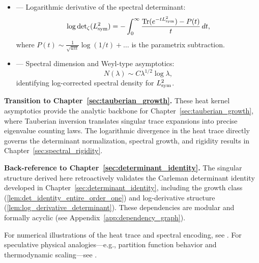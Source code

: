 \begin{itemize}
  \item {} — Logarithmic derivative of the spectral determinant:
  \[
  \log \det\nolimits_{\zeta}(L_{\mathrm{sym}}^2)
  = -\int_0^\infty \frac{\operatorname{Tr}(e^{-t L_{\mathrm{sym}}^2}) - P(t)}{t} \, dt,
  \]
  where \( P(t) \sim \frac{1}{\sqrt{4\pi t}} \log(1/t) + \dots \) is the parametrix subtraction.

  \item {} — Spectral dimension and Weyl-type asymptotics:
  \[
  N(\lambda) \sim C \lambda^{1/2} \log \lambda,
  \]
  identifying log-corrected spectral density for \( L_{\mathrm{sym}}^2 \).
\end{itemize}

\medskip

\noindent\textbf{Transition to Chapter~\ref{sec:tauberian_growth}.}  
These heat kernel asymptotics provide the analytic backbone for Chapter~\ref{sec:tauberian_growth}, where Tauberian inversion translates singular trace expansions into precise eigenvalue counting laws. The logarithmic divergence in the heat trace directly governs the determinant normalization, spectral growth, and rigidity results in Chapter~\ref{sec:spectral_rigidity}.

\medskip

\noindent\textbf{Back-reference to Chapter~\ref{sec:determinant_identity}.}  
The singular structure derived here retroactively validates the Carleman determinant identity developed in Chapter~\ref{sec:determinant_identity}, including the growth class (\cref{lem:det_identity_entire_order_one}) and log-derivative structure (\cref{lem:log_derivative_determinant}). These dependencies are modular and formally acyclic (see Appendix~\ref{app:dependency_graph}).

\medskip

\noindent
For numerical illustrations of the heat trace and spectral encoding, see . For speculative physical analogies—e.g., partition function behavior and thermodynamic scaling—see .
